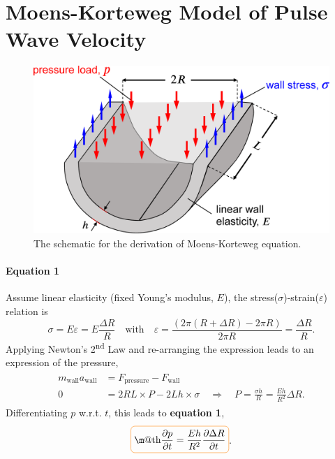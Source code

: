 \documentclass[a4paper]{article}
\makeatletter
\newcommand*{\boxcolor}{orange}
\renewcommand{\boxed}[1]{\textcolor{\boxcolor}{%
\tikz[baseline={([yshift=-1ex]current bounding box.center)}] \node [rectangle, minimum width=1ex,rounded corners,draw] {\normalcolor\m@th$\displaystyle#1$};}}
\makeatother
\begin{document}
\section{Moens-Korteweg Model of Pulse Wave Velocity}
\begin{figure}[H]
    \centering
    \includegraphics[width=.55\textwidth]{img/Moens-Korteweg.eps}
    \caption{The schematic for the derivation of Moens-Korteweg equation.}
\end{figure}

\paragraph{Equation 1} Assume linear elasticity (fixed Young's modulus, $E$), the stress($\sigma$)-strain($\varepsilon$) relation is 
\[
    \sigma = E \varepsilon = E \frac{\Delta R}{R}
    \quad \text{with} \quad
    \varepsilon = \frac{(2\pi (R+\Delta R) - 2\pi R)}{2\pi R} = \frac{\Delta R}{R}.
\]
Applying Newton's 2\textsuperscript{nd} Law and re-arranging the expression leads to an expression of the pressure,
\begin{align*}
    \begin{split}
        m_{\text{wall}} a_{\text{wall}} 
        & = F_{\text{pressure}} - F_{\text{wall}} \\
        0 & = 2 R L \times P - 2 L h \times \sigma \quad \Rightarrow \quad P = \frac{\sigma h}{R} = \frac{Eh}{R^2} \Delta R.
    \end{split}
\end{align*}
Differentiating $p$ w.r.t. $t$, this leads to \textbf{equation 1},
\[
\boxed{
    \frac{\partial p}{\partial t} = \frac{Eh}{R^2} \frac{\partial \Delta R}{\partial t}
}.
\]
\end{document}
